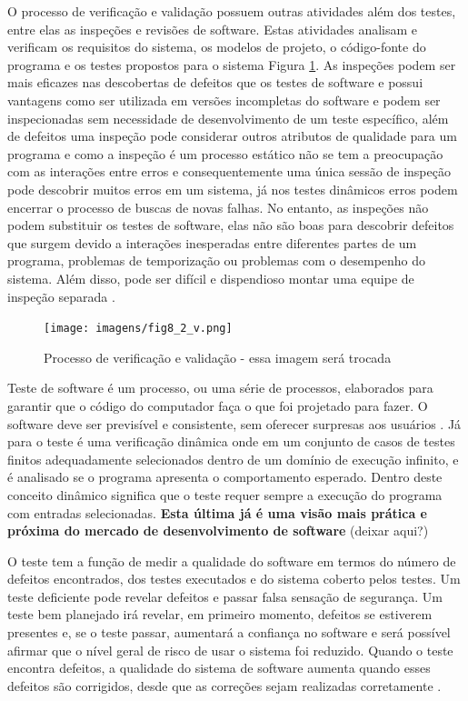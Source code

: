 \documentclass[dm,ppgcomp]{texfurg} %
\begin{document}
O processo de verificação e validação possuem outras atividades além dos testes, entre elas as inspeções e revisões de software. Estas atividades analisam e verificam os requisitos do sistema, os modelos de projeto, o código-fonte do programa e os testes propostos para o sistema Figura \ref{fig:ver&val}. As inspeções podem ser mais eficazes nas descobertas de defeitos que os testes de software e possui vantagens como ser utilizada em  versões incompletas do software e podem ser inspecionadas sem necessidade de desenvolvimento de um teste específico, além de defeitos uma inspeção pode considerar outros atributos de qualidade para um programa e como a inspeção é um processo estático não se tem a preocupação com as interações entre erros e consequentemente uma única sessão de inspeção pode descobrir muitos erros em um sistema, já nos testes dinâmicos erros podem encerrar o processo de buscas de novas falhas. No entanto, as inspeções não podem substituir os testes de software, elas não são boas para descobrir defeitos que surgem devido a interações inesperadas entre diferentes partes de um programa, problemas de temporização ou problemas com o desempenho do sistema. Além disso, pode ser difícil e dispendioso montar uma equipe de inspeção separada \cite{sommerville2010}. 

\begin{figure}[ht]
\centering
\texttt{[image: imagens/fig8\_2\_v.png]}
\caption{Processo de verificação e validação - essa imagem será trocada}
\label{fig:ver&val}
\end{figure}

Teste de software é um processo, ou uma série de processos, elaborados para garantir que o código do computador faça o que foi projetado para fazer. O software deve ser previsível e consistente, sem oferecer surpresas aos usuários \cite{myers2011art}. Já para \cite{bourque2014guide} o teste é uma verificação dinâmica onde em um conjunto de casos de testes finitos adequadamente selecionados dentro de um domínio de execução infinito, e é analisado se o programa apresenta o comportamento esperado. Dentro deste conceito dinâmico significa que o teste requer sempre a execução do programa com entradas selecionadas. \textbf{Esta última já é uma visão mais prática e próxima do mercado de desenvolvimento de software} (deixar aqui?)

O teste tem a função de medir a qualidade do software em termos do número de defeitos encontrados, dos testes executados e do sistema coberto pelos testes. Um teste deficiente pode revelar defeitos e passar falsa sensação de segurança. Um teste bem planejado irá revelar, em primeiro momento, defeitos se estiverem presentes e, se o teste passar, aumentará a confiança no software e será possível afirmar que o nível geral de risco de usar o sistema foi reduzido. Quando o teste encontra defeitos, a qualidade do sistema de software aumenta quando esses defeitos são corrigidos, desde que as correções sejam realizadas corretamente \cite{graham2008foundations}.
\end{document}
